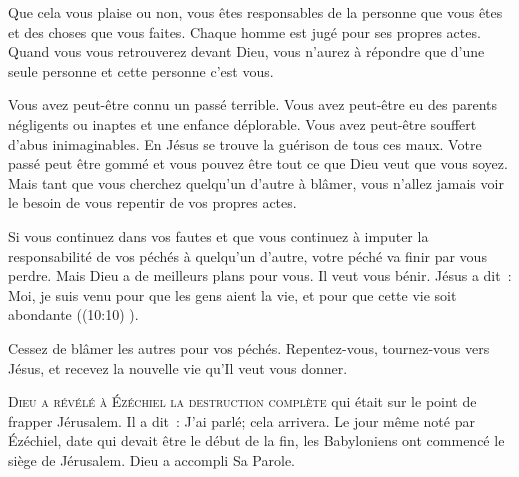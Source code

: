 Que cela vous plaise ou non, vous êtes responsables de la personne
 que vous êtes et des choses que vous faites.
 Chaque homme est jugé pour ses propres actes.
 Quand vous vous retrouverez devant Dieu, 
 vous n'aurez à répondre que d'une seule personne
 \ocadr et cette personne c'est vous. 


Vous avez peut-être connu un passé terrible.
 Vous avez peut-être eu des parents négligents ou inaptes
 et une enfance déplorable. Vous avez peut-être souffert
 d'abus inimaginables. En Jésus se trouve la guérison de tous ces maux.
 Votre passé peut être gommé et vous pouvez être tout ce que Dieu
 veut que vous soyez. Mais tant que vous cherchez 
 quelqu'un d'autre à blâmer, vous n'allez jamais voir le besoin
 de vous repentir de vos propres actes. 

Si vous continuez dans vos fautes et que vous continuez
 à imputer la responsabilité de vos péchés à quelqu'un d'autre,
 votre péché va finir par vous perdre.
 Mais Dieu a de meilleurs plans pour vous. Il veut vous bénir.
 Jésus a dit~: 
 \og Moi, je suis venu pour que les gens aient la vie,
 et pour que cette vie soit abondante \fg{} ((10:10) \BFC). 

Cessez de blâmer les autres pour vos péchés.
 Repentez-vous, tournez-vous vers Jésus,
 et recevez la nouvelle vie qu'Il veut vous donner. 

\dvrule






\lettrine{D}{ieu a révélé à Ézéchiel la destruction complète}
 qui était sur le point de frapper Jérusalem. Il a dit~: 
 \og J'ai parlé; cela arrivera. \fg{}
 Le jour même noté par Ézéchiel, date qui devait être le début de la fin,
 les Babyloniens ont commencé le siège de Jérusalem. Dieu a accompli Sa Parole. 


